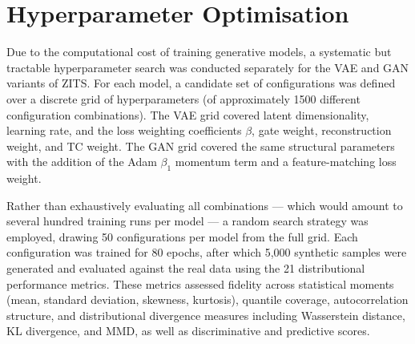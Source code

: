 \documentclass[make,article,submit,moreauthors]{Definitions/mdpi}
\begin{document}



















\appendixstart
\appendix


\section[\appendixname~\thesection]{Hyperparameter Optimisation}
\label{app:hyperparams}

Due to the computational cost of training generative models, a systematic but tractable hyperparameter search was conducted separately for the VAE and GAN variants of ZITS. For each model, a candidate set of configurations was defined over a discrete grid of hyperparameters (of approximately 1500 different configuration combinations). The VAE grid covered latent dimensionality, learning rate, and the loss weighting coefficients $\beta$, gate weight, reconstruction weight, and TC weight. The GAN grid covered the same structural parameters with the addition of the Adam $\beta_1$ momentum term and a feature-matching loss weight. 

Rather than exhaustively evaluating all combinations — which would amount to several hundred training runs per model — a random search strategy was employed, drawing 50 configurations per model from the full grid. Each configuration was trained for 80 epochs, after which 5,000 synthetic samples were generated and evaluated against the real data using the 21 distributional performance metrics. These metrics assessed fidelity across statistical moments (mean, standard deviation, skewness, kurtosis), quantile coverage, autocorrelation structure, and distributional divergence measures including Wasserstein distance, KL divergence, and MMD, as well as discriminative and predictive scores.
\end{document}
